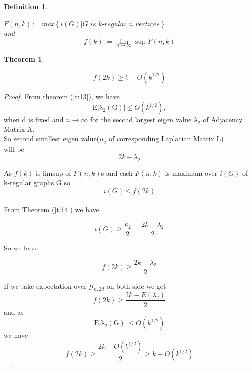 \documentclass[oneside]{book}
\newtheorem{theorem}{Theorem}[section]
\newtheorem{mydef}{Definition}[section]
\begin{document}
	\begin{mydef} \label{d:19}
		
		
		$F(n, k)$:= max$\left\{i(G)| \textit{G is k-regular  n vertices} \right\}$ \\
		and
		$$
		f(k):=\lim _{n \rightarrow \infty} \sup F(n, k)
		$$
	\end{mydef}
	
	
	\begin{theorem}
		\label{t:15}
		
		
		$$f(2 k) \geq k-O\left(k^{1 / 2}\right)$$ 
		
	\end{theorem}
	
	
	\begin{proof} 
		From theorem (\ref{t:13}), we have  $$\mathrm{E|\lambda_{2}(G)|}
		\leq O(k^{1/2}),$$ when d is fixed and $n\rightarrow \infty$ for the second largest eigen value $\lambda_{2}$ of Adjacency Matrix A. \\
		So second smallest eigen value($\mu_{2}$ of corresponding Laplacian Matrix L) \\will be 
		$$2k - \lambda_{2}$$ 
		
		
		As $f(k)$ is limsup of $F(n,k)$s and each $F(n,k)$ is maximum over $i(G)$ of k-regular graphs G
		so $$i(G)\leq f(2k)$$
		\\
		From Theorem (\ref{t:14}) we have
		
		$$i(G) \geq \frac{\mu_2}{2} = \frac{2k - \lambda_{2}}{2}  $$
		
		So we have
		
		$$
		f(2k) \geq \frac{2k - \lambda_{2}}{2}
		$$
		
		If we take expectation over $\mathscr{G}_{n, 2 d}$ on both side we get 
		$$
		f(2k) \geq \frac{2k - E(\lambda_{2})}{2}
		$$
		and as $$\mathrm{E|\lambda_{2}(G)|}
		\leq O(k^{1/2})$$ we have 
		$$
		f(2k) \geq \frac{2k - O(k^{1/2})}{2} \geq k - O(k^{1/2}) 
		$$
		
	\end{proof}  
	
\end{document}
